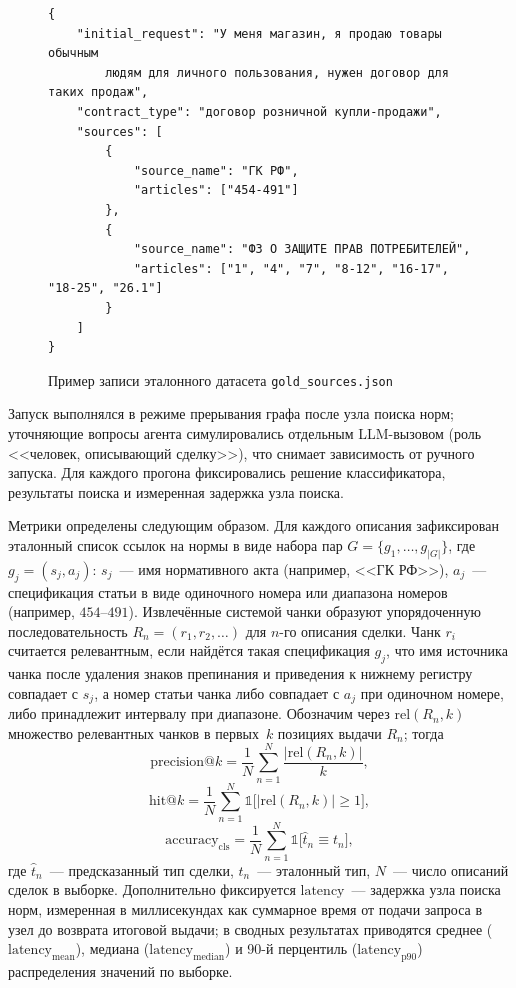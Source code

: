 \begin{figure}[H]
\begin{lstlisting}[style=promptstyle, language={}]
{
    "initial_request": "У меня магазин, я продаю товары обычным
        людям для личного пользования, нужен договор для таких продаж",
    "contract_type": "договор розничной купли-продажи",
    "sources": [
        {
            "source_name": "ГК РФ",
            "articles": ["454-491"]
        },
        {
            "source_name": "ФЗ О ЗАЩИТЕ ПРАВ ПОТРЕБИТЕЛЕЙ",
            "articles": ["1", "4", "7", "8-12", "16-17", "18-25", "26.1"]
        }
    ]
}
\end{lstlisting}
\caption{Пример записи эталонного датасета \texttt{gold\_sources.json}}
\label{fig:gold-sample}
\end{figure}

Запуск выполнялся в режиме прерывания графа после узла поиска норм; уточняющие вопросы агента симулировались отдельным LLM-вызовом (роль <<человек, описывающий сделку>>), что снимает зависимость от ручного запуска. Для каждого прогона фиксировались решение классификатора, результаты поиска и измеренная задержка узла поиска.

Метрики определены следующим образом. Для каждого описания зафиксирован эталонный список ссылок на нормы в виде набора пар $G = \{g_1, \dots, g_{|G|}\}$, где $g_j = (s_j, a_j)$: $s_j$~--- имя нормативного акта (например, <<ГК РФ>>), $a_j$~--- спецификация статьи в виде одиночного номера или диапазона номеров (например, $454$--$491$). Извлечённые системой чанки образуют упорядоченную последовательность $R_n = (r_1, r_2, \dots)$ для $n$-го описания сделки. Чанк $r_i$ считается релевантным, если найдётся такая спецификация $g_j$, что имя источника чанка после удаления знаков препинания и приведения к нижнему регистру совпадает с $s_j$, а номер статьи чанка либо совпадает с $a_j$ при одиночном номере, либо принадлежит интервалу при диапазоне. Обозначим через $\mathrm{rel}(R_n, k)$ множество релевантных чанков в первых~$k$ позициях выдачи $R_n$; тогда
\begin{equation}
\mathrm{precision}@k = \frac{1}{N}\sum_{n=1}^{N}\frac{|\mathrm{rel}(R_n, k)|}{k},
\end{equation}
\begin{equation}
\mathrm{hit}@k = \frac{1}{N}\sum_{n=1}^{N}\mathbb{1}\bigl[|\mathrm{rel}(R_n, k)| \ge 1\bigr],
\end{equation}
\begin{equation}
\mathrm{accuracy}_{\mathrm{cls}} = \frac{1}{N}\sum_{n=1}^{N}\mathbb{1}\bigl[\hat{t}_n \equiv t_n\bigr],
\end{equation}
где $\hat{t}_n$~--- предсказанный тип сделки, $t_n$~--- эталонный тип, $N$~--- число описаний сделок в выборке. Дополнительно фиксируется $\mathrm{latency}$~--- задержка узла поиска норм, измеренная в миллисекундах как суммарное время от подачи запроса в узел до возврата итоговой выдачи; в сводных результатах приводятся среднее ($\mathrm{latency}_{\mathrm{mean}}$), медиана ($\mathrm{latency}_{\mathrm{median}}$) и 90-й перцентиль ($\mathrm{latency}_{\mathrm{p90}}$) распределения значений по выборке.

